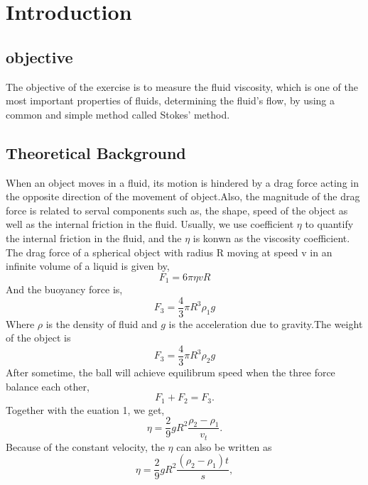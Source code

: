\documentclass[12pt]{article}
\begin{document}
    \thispagestyle{empty}
	\renewcommand\thesection{\Roman{section}}
    
    \newpage
    \section{Introduction}
    \subsection{objective}
        The objective of the exercise is to measure the fluid viscosity,
        which is one of the most important properties of fluids, determining the
        fluid’s flow, by using a common and simple method called Stokes' method.
    \subsection{Theoretical Background}
        When an object moves in a fluid, its motion is hindered by a drag force acting in the opposite 
        direction of the movement of object.Also, the magnitude of the drag force is related to serval 
        components such as, the shape, speed of the object as well as the internal friction in the fluid.
        Usually, we use coefficient $\eta$ to quantify the internal friction in the fluid, and the $\eta$
        is konwn as the viscosity coefficient. The drag force of a spherical object with radius R moving at 
        speed v in an infinite volume of a liquid is given by,
        \begin{equation} \label{F1}
        F_1=6\pi\eta vR
        \end{equation}
        And the buoyancy force is,
        $$F_3=\frac{4}{3}\pi R^3\rho_1g$$   
        Where $\rho$ is the density of fluid and $g$ is the acceleration due to gravity.The weight of the object is
        $$F_3=\frac{4}{3}\pi R^3\rho_2g$$
        After sometime, the ball will achieve equilibrum speed when the three force balance each other,
        \begin{equation} \label{Balance}
            F_1+F_2=F_3.
        \end{equation}
        Together with the euation 1, we get,
        \begin{equation}\label{3}
                    \eta=\frac{2}{9}gR^2\frac{\rho_2-\rho_1}{v_t}.
        \end{equation}
        Because of the constant velocity, the $\eta$ can also be written as
        \begin{equation} \label{eta}
            \eta=\frac{2}{9}gR^2\frac{(\rho_2-\rho_1)t}{s},
        \end{equation}
\end{document}
